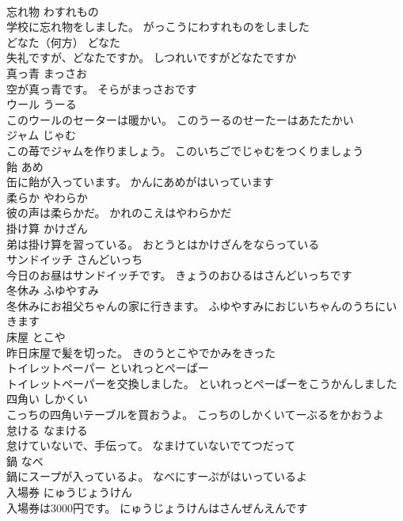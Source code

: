 \documentclass[8pt]{extreport}
\begin{document}
\begin{CJK}{UTF8}{min}
\\	忘れ物	わすれもの	
\\	学校に忘れ物をしました。	がっこうにわすれものをしました	
\\	どなた（何方）	どなた	
\\	失礼ですが、どなたですか。	しつれいですがどなたですか	
\\	真っ青	まっさお	
\\	空が真っ青です。	そらがまっさおです	
\\	ウール	うーる	
\\	このウールのセーターは暖かい。	このうーるのせーたーはあたたかい	
\\	ジャム	じゃむ	
\\	この苺でジャムを作りましょう。	このいちごでじゃむをつくりましょう	
\\	飴	あめ	
\\	缶に飴が入っています。	かんにあめがはいっています	
\\	柔らか	やわらか	
\\	彼の声は柔らかだ。	かれのこえはやわらかだ	
\\	掛け算	かけざん	
\\	弟は掛け算を習っている。	おとうとはかけざんをならっている	
\\	サンドイッチ	さんどいっち	
\\	今日のお昼はサンドイッチです。	きょうのおひるはさんどいっちです	
\\	冬休み	ふゆやすみ	
\\	冬休みにお祖父ちゃんの家に行きます。	ふゆやすみにおじいちゃんのうちにいきます	
\\	床屋	とこや	
\\	昨日床屋で髪を切った。	きのうとこやでかみをきった	
\\	トイレットペーパー	といれっとぺーぱー	
\\	トイレットペーパーを交換しました。	といれっとぺーぱーをこうかんしました	
\\	四角い	しかくい	
\\	こっちの四角いテーブルを買おうよ。	こっちのしかくいてーぶるをかおうよ	
\\	怠ける	なまける	
\\	怠けていないで、手伝って。	なまけていないでてつだって	
\\	鍋	なべ	
\\	鍋にスープが入っているよ。	なべにすーぷがはいっているよ	
\\	入場券	にゅうじょうけん	
\\	入場券は3000円です。	にゅうじょうけんはさんぜんえんです	

\end{CJK}
\end{document}
